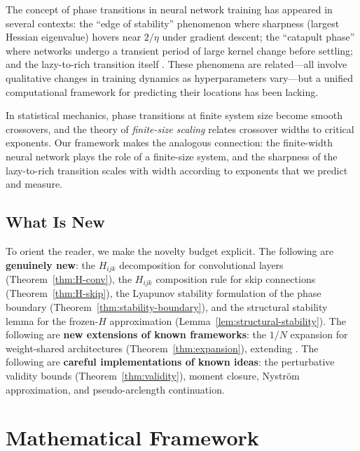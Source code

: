 \documentclass[11pt]{article}
\theoremstyle{definition}
\begin{document}
The concept of phase transitions in neural network training has appeared in several contexts: the ``edge of stability'' phenomenon \citep{cohen2021gradient} where sharpness (largest Hessian eigenvalue) hovers near $2/\eta$ under gradient descent; the ``catapult phase'' \citep{lewkowycz2020large} where networks undergo a transient period of large kernel change before settling; and the lazy-to-rich transition itself \citep{chizat2019lazy,woodworth2020kernel,geiger2020disentangling}. These phenomena are related---all involve qualitative changes in training dynamics as hyperparameters vary---but a unified computational framework for predicting their locations has been lacking.

In statistical mechanics, phase transitions at finite system size become smooth crossovers, and the theory of \emph{finite-size scaling} \citep{fisher1972scaling,binder1981finite} relates crossover widths to critical exponents. Our framework makes the analogous connection: the finite-width neural network plays the role of a finite-size system, and the sharpness of the lazy-to-rich transition scales with width according to exponents that we predict and measure.

\subsection{What Is New}

To orient the reader, we make the novelty budget explicit. The following are \textbf{genuinely new}: the $H_{ijk}$ decomposition for convolutional layers (Theorem~\ref{thm:H-conv}), the $H_{ijk}$ composition rule for skip connections (Theorem~\ref{thm:H-skip}), the Lyapunov stability formulation of the phase boundary (Theorem~\ref{thm:stability-boundary}), and the structural stability lemma for the frozen-$H$ approximation (Lemma~\ref{lem:structural-stability}). The following are \textbf{new extensions of known frameworks}: the $1/N$ expansion for weight-shared architectures (Theorem~\ref{thm:expansion}), extending \citet{dyer2020asymptotics}. The following are \textbf{careful implementations of known ideas}: the perturbative validity bounds (Theorem~\ref{thm:validity}), moment closure, Nystr\"om approximation, and pseudo-arclength continuation.

\section{Mathematical Framework}
\label{sec:framework}
\end{document}
